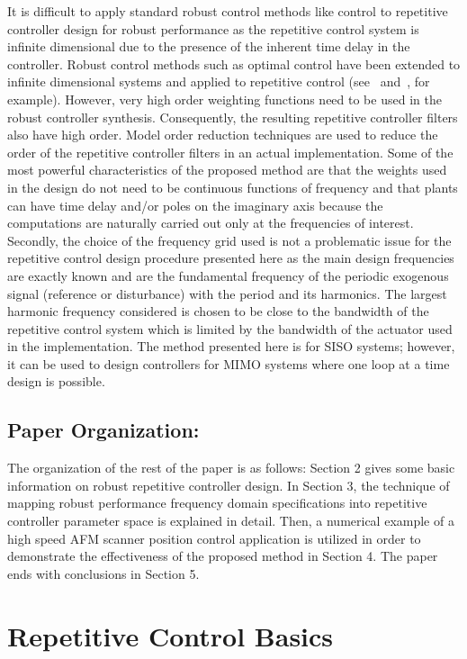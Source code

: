 \documentclass[12pt,draftcls,onecolumn]{IEEEtran}
\begin{document}
It is difficult to apply standard robust control methods like
 control to repetitive controller design for robust
performance as the repetitive control system is infinite
dimensional due to the presence of the inherent time delay in the
controller. Robust control methods such as  optimal
control have been extended to infinite dimensional systems and
applied to repetitive control (see~\cite{SOJ:95} and~\cite{PeO:97}, for example).
However, very high order weighting functions need to be used in
the robust controller synthesis. Consequently, the resulting
repetitive controller filters also have high order. Model order
reduction techniques are used to reduce the order of the
repetitive controller filters in an actual implementation. Some of
the most powerful characteristics of the proposed method are that
the weights used in the design do not need to be continuous
functions of frequency and that plants can have time delay and/or
poles on the imaginary axis because the computations are naturally
carried out only at the frequencies of interest. Secondly, the
choice of the frequency grid used is not a problematic issue for
the repetitive control design procedure presented here as the main
design frequencies are exactly known and are the fundamental
frequency of the periodic exogenous signal (reference or
disturbance) with the period  and its harmonics. The
largest harmonic frequency considered is chosen to be close to the
bandwidth of the repetitive control system which is limited by the
bandwidth of the actuator used in the implementation. The method
presented here is for SISO systems; however, it can be used to
design controllers for MIMO systems where one loop at a time
design is possible.

\subsection*{Paper Organization:}

The organization of the rest of the paper is as follows: Section 2
gives some basic information on robust repetitive controller
design. In Section 3, the technique of mapping robust performance
frequency domain specifications into repetitive controller
parameter space is explained in detail. Then, a numerical example
of a high speed AFM scanner position control application is
utilized in order to demonstrate the effectiveness of the proposed
method in Section 4. The paper ends with conclusions in Section 5.

\section{Repetitive Control Basics}
\end{document}
